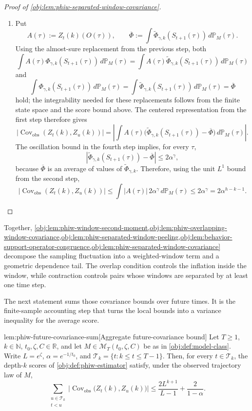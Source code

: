 \documentclass[11pt]{article}
\begin{document}
\begin{proof}[Proof of \cref{obj:lem:phiw-separated-window-covariance}]
\begin{enumerate}
\item Put
\[
A(\tau):=Z_t(k)(O(\tau)),
\qquad
\overline\Phi:=
\int \widetilde\Phi_{\gamma,k}(S_{t+1}(\tau))\,d\mathbb P_M(\tau).
\]
Using the almost-sure replacement from the previous step, both
\[
\int A(\tau)\Phi_{\gamma,k}(S_{t+1}(\tau))\,d\mathbb P_M(\tau)
=
\int A(\tau)\widetilde\Phi_{\gamma,k}(S_{t+1}(\tau))\,d\mathbb P_M(\tau)
\]
and
\[
\int \Phi_{\gamma,k}(S_{t+1}(\tau))\,d\mathbb P_M(\tau)
=
\int \widetilde\Phi_{\gamma,k}(S_{t+1}(\tau))\,d\mathbb P_M(\tau)
=
\overline\Phi
\]
hold; the integrability needed for these replacements follows from the finite state space and the score bound above. The centered representation from the first step therefore gives
\[
\left|\operatorname{Cov}_{\mathrm{obs}}(Z_t(k),Z_u(k))\right|
=
\left|
\int A(\tau)\bigl(\widetilde\Phi_{\gamma,k}(S_{t+1}(\tau))-\overline\Phi\bigr)
\,d\mathbb P_M(\tau)
\right|.
\]
The oscillation bound in the fourth step implies, for every \(\tau\),
\[
\left|\widetilde\Phi_{\gamma,k}(S_{t+1}(\tau))-\overline\Phi\right|
\le 2\alpha^\gamma,
\]
because \(\overline\Phi\) is an average of values of \(\widetilde\Phi_{\gamma,k}\). Therefore, using the unit \(L^1\) bound from the second step,
\[
\left|\operatorname{Cov}_{\mathrm{obs}}(Z_t(k),Z_u(k))\right|
\le
\int |A(\tau)|\,2\alpha^\gamma\,d\mathbb P_M(\tau)
\le
2\alpha^\gamma
=
2\alpha^{h-k-1}.
\] %
\end{enumerate}
\end{proof}

Together, \cref{obj:lem:phiw-window-second-moment,obj:lem:phiw-overlapping-window-covariance,obj:lem:phiw-separated-window-peeling,obj:lem:behavior-support-operator-congruence,obj:lem:phiw-separated-window-covariance} decompose the sampling fluctuation into a weighted-window term and a geometric dependence tail. The overlap condition controls the inflation inside the window, while contraction controls pairs whose windows are separated by at least one time step.

The next statement sums those covariance bounds over future times. It is the finite-sample accounting step that turns the local bounds into a variance inequality for the average score.

\begin{lemmav}{lem:phiw-future-covariance-sum}[Aggregate future-covariance bound]
Let \(T\ge1\), \(k\in\mathbb N\), \(t_0,\zeta,C\in\mathbb R\), and let \(M\in\mathcal M_T(t_0,\zeta,C)\) be as in \cref{obj:def:model-class}. Write \(L=e^{\zeta}\), \(\alpha=e^{-1/t_0}\), and \(\mathscr T_k=\{t:k\le t\le T-1\}\). Then, for every \(t\in\mathscr T_k\), the depth-\(k\) scores of \cref{obj:def:phiw-estimator} satisfy, under the observed trajectory law of \(M\),
\[
\sum_{\substack{u\in\mathscr T_k\\ t<u}}
\bigl|\operatorname{Cov}_{\mathrm{obs}}\bigl(Z_t(k),Z_u(k)\bigr)\bigr|
\le
\frac{2L^{k+1}}{L-1}+\frac{2}{1-\alpha}.
\]
\end{lemmav}
\end{document}

